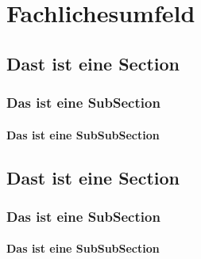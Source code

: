 \chapter{Fachlichesumfeld}
\section{Dast ist eine Section}
\subsection{Das ist eine SubSection}
\subsubsection{Das ist eine SubSubSection}
\newpage
\section{Dast ist eine Section}
\subsection{Das ist eine SubSection}
\subsubsection{Das ist eine SubSubSection}